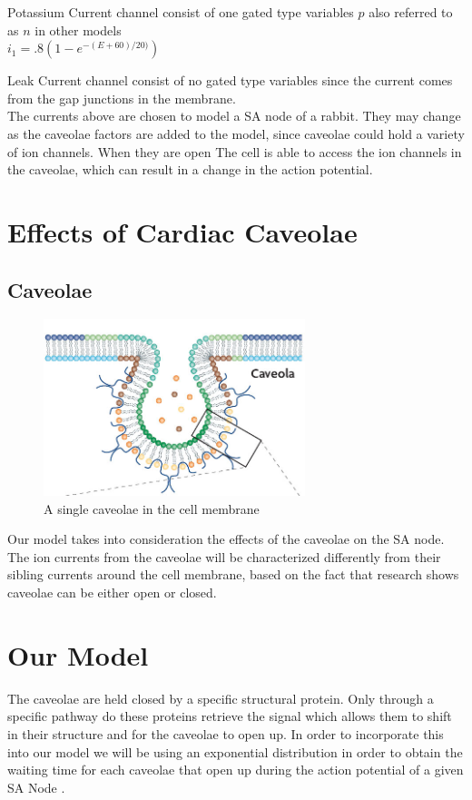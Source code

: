 \documentclass{bmcart}%
\begin{document}
Potassium Current channel consist of one gated type variables $p$ also referred to as $n$ in other models
\\
$i_1 = .8(1-e^{-(E+60)/20)})$

Leak Current channel consist of no gated type variables since the current comes from the gap junctions in the membrane.  
\\
\cite{CellML}
The currents above are chosen to model a SA node of a rabbit. They may change as the caveolae factors are added to the model, since caveolae could hold a variety of ion channels. When they are open The cell is able to access the ion channels in the caveolae, which can result in a change in the action potential. 


\section*{Effects of Cardiac Caveolae}
\subsection*{Caveolae}

\begin{figure}[h!]
  \centering
  \includegraphics[width=3in]{cavealoa}
  \caption[cavealoa]
  {A single caveolae in the cell membrane}
\label{fig:ActionPotential2}
\end{figure}

Our model takes into consideration the effects of the caveolae on the SA node. The ion currents from the caveolae will be characterized differently from their sibling currents around the cell membrane, based on the fact that research shows caveolae can be either open or closed.

\section*{Our Model}
The caveolae are held closed by a specific structural protein. Only through a specific pathway do these proteins retrieve the signal which allows them to shift in their structure and for the caveolae to open up. In order to incorporate this into our model we will be using an exponential distribution in order to obtain the waiting time for each caveolae that open up during the action potential of a given SA Node\cite{Barb06} . 
\end{document}
